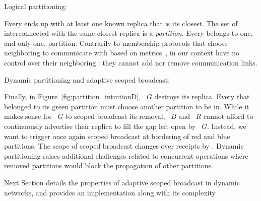 \begin{asparadesc}
\item [Logical partitioning:]

Every \process ends up with at least one known replica that is its
closest. The set of interconnected \processes with the same closest
replica is a \emph{partition}. Every \process belongs to one, and only
one, partition. Contrarily to membership protocols that choose
neighboring \processes to communicate with based on metrics~\cite{t-man},
\processes in our context have no control over their neighboring
\processes: they cannot add nor remove communication links.

\item [Dynamic partitioning and adaptive scoped broadcast:]

Finally, in Figure~\ref{fig:partition_intuitionD}, \Process~$G$
destroys its replica. Every \processes that belonged to its green
partition must choose another partition to be in. While it makes sense
for \Process~$G$ to scoped broadcast its removal, \Process~$B$ and
\Process~$R$ cannot afford to continuously advertise their replica to
fill the gap left open by \Process~$G$. Instead, we want to trigger
once again scoped broadcast at bordering \processes of red and blue
partitions. The scope of scoped broadcast changes over receipts by
\processes. Dynamic partitioning raises additional challenges related
to concurrent operations where removed partitions would block the
propagation of other partitions.
\end{asparadesc}

Next Section details the properties of adaptive scoped broadcast in
dynamic networks, and provides an implementation along with its
complexity.


